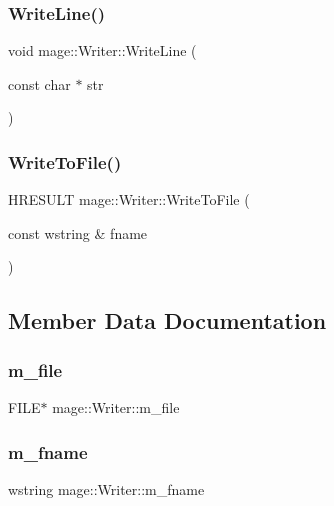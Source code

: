 \hypertarget{classmage_1_1_writer_a454d553d7cf0c3680d48ed9528f22dbd}{}\label{classmage_1_1_writer_a454d553d7cf0c3680d48ed9528f22dbd} 
\subsubsection{\texorpdfstring{Write\+Line()}{WriteLine()}}
{\footnotesize\ttfamily void mage\+::\+Writer\+::\+Write\+Line (\begin{DoxyParamCaption}\item[{const char $\ast$}]{str }\end{DoxyParamCaption})\hspace{0.3cm}{\ttfamily [protected]}}

\hypertarget{classmage_1_1_writer_ae9250f340229ee80dc5c518045567f7d}{}\label{classmage_1_1_writer_ae9250f340229ee80dc5c518045567f7d} 
\subsubsection{\texorpdfstring{Write\+To\+File()}{WriteToFile()}}
{\footnotesize\ttfamily H\+R\+E\+S\+U\+LT mage\+::\+Writer\+::\+Write\+To\+File (\begin{DoxyParamCaption}\item[{const wstring \&}]{fname }\end{DoxyParamCaption})}



\subsection{Member Data Documentation}
\hypertarget{classmage_1_1_writer_a04428b72245b50d45c62cbd23c2f039a}{}\label{classmage_1_1_writer_a04428b72245b50d45c62cbd23c2f039a} 
\subsubsection{\texorpdfstring{m\+\_\+file}{m\_file}}
{\footnotesize\ttfamily F\+I\+LE$\ast$ mage\+::\+Writer\+::m\+\_\+file\hspace{0.3cm}{\ttfamily [private]}}

\hypertarget{classmage_1_1_writer_afa271ee47897d4961e9d62132d8faeb5}{}\label{classmage_1_1_writer_afa271ee47897d4961e9d62132d8faeb5} 
\subsubsection{\texorpdfstring{m\+\_\+fname}{m\_fname}}
{\footnotesize\ttfamily wstring mage\+::\+Writer\+::m\+\_\+fname\hspace{0.3cm}{\ttfamily [private]}}

